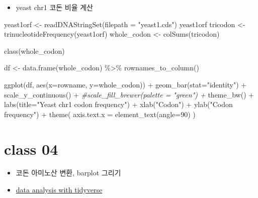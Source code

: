\documentclass[
]{book}
\newenvironment{Shaded}{\begin{snugshade}}{\end{snugshade}}
\newcommand{\AttributeTok}[1]{\textcolor[rgb]{0.77,0.63,0.00}{#1}}
\newcommand{\CommentTok}[1]{\textcolor[rgb]{0.56,0.35,0.01}{\textit{#1}}}
\newcommand{\DecValTok}[1]{\textcolor[rgb]{0.00,0.00,0.81}{#1}}
\newcommand{\FunctionTok}[1]{\textcolor[rgb]{0.00,0.00,0.00}{#1}}
\newcommand{\NormalTok}[1]{#1}
\newcommand{\OtherTok}[1]{\textcolor[rgb]{0.56,0.35,0.01}{#1}}
\newcommand{\SpecialCharTok}[1]{\textcolor[rgb]{0.00,0.00,0.00}{#1}}
\newcommand{\StringTok}[1]{\textcolor[rgb]{0.31,0.60,0.02}{#1}}
\providecommand{\tightlist}{%
  \setlength{\itemsep}{0pt}\setlength{\parskip}{0pt}}
\begin{document}
\begin{itemize}
\tightlist
\item
  yeast chr1 코돈 비율 계산
\end{itemize}

\begin{Shaded}
\begin{Highlighting}[]
\NormalTok{yeast1orf }\OtherTok{\textless{}{-}} \FunctionTok{readDNAStringSet}\NormalTok{(}\AttributeTok{filepath =} \StringTok{"yeast1.cds"}\NormalTok{)}
\NormalTok{yeast1orf}
\NormalTok{tricodon }\OtherTok{\textless{}{-}} \FunctionTok{trinucleotideFrequency}\NormalTok{(yeast1orf)}
\NormalTok{whole\_codon }\OtherTok{\textless{}{-}} \FunctionTok{colSums}\NormalTok{(tricodon)}

\FunctionTok{class}\NormalTok{(whole\_codon)}

\NormalTok{df }\OtherTok{\textless{}{-}} \FunctionTok{data.frame}\NormalTok{(whole\_codon) }\SpecialCharTok{\%\textgreater{}\%} 
  \FunctionTok{rownames\_to\_column}\NormalTok{() }

\FunctionTok{ggplot}\NormalTok{(df, }\FunctionTok{aes}\NormalTok{(}\AttributeTok{x=}\NormalTok{rowname, }\AttributeTok{y=}\NormalTok{whole\_codon)) }\SpecialCharTok{+}
  \FunctionTok{geom\_bar}\NormalTok{(}\AttributeTok{stat=}\StringTok{"identity"}\NormalTok{) }\SpecialCharTok{+}
  \FunctionTok{scale\_y\_continuous}\NormalTok{() }\SpecialCharTok{+}
  \CommentTok{\#scale\_fill\_brewer(palette = "green") +}
  \FunctionTok{theme\_bw}\NormalTok{() }\SpecialCharTok{+}
  \FunctionTok{labs}\NormalTok{(}\AttributeTok{title=}\StringTok{"Yeast chr1 codon frequency"}\NormalTok{) }\SpecialCharTok{+}
  \FunctionTok{xlab}\NormalTok{(}\StringTok{"Codon"}\NormalTok{) }\SpecialCharTok{+} 
  \FunctionTok{ylab}\NormalTok{(}\StringTok{"Codon frequency"}\NormalTok{) }\SpecialCharTok{+}
  \FunctionTok{theme}\NormalTok{(}
    \AttributeTok{axis.text.x =} \FunctionTok{element\_text}\NormalTok{(}\AttributeTok{angle=}\DecValTok{90}\NormalTok{)}
\NormalTok{  )}
\end{Highlighting}
\end{Shaded}

\hypertarget{class-04-2}{%
\section{class 04}\label{class-04-2}}

\begin{itemize}
\tightlist
\item
  코돈 아미노산 변환, barplot 그리기
\item
  \href{https://greendaygh.github.io/kribbr2022/tidyverse.html\#dplyr}{data analysis with tidyverse}
\end{itemize}
\end{document}
